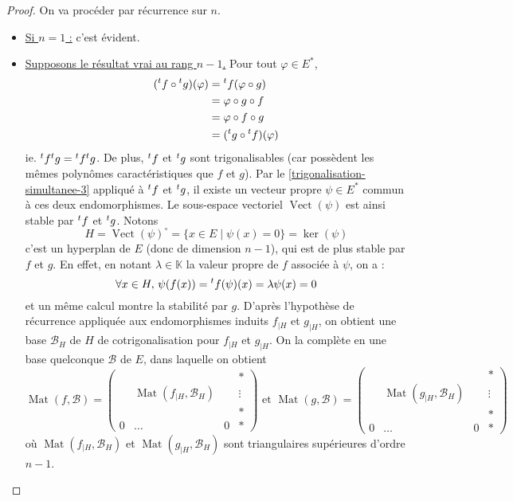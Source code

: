   \begin{proof}
    On va procéder par récurrence sur $n$.
    \begin{itemize}
      \item \uline{Si $n = 1$ :} c'est évident.
      \item \uline{Supposons le résultat vrai au rang $n - 1$.} Pour tout $\varphi \in E^*$,
      \begin{align*}
        (\mathstrut ^t f \circ \mathstrut ^t g)(\varphi) &= \mathstrut ^t f (\varphi \circ g) \\
        &= \varphi \circ g \circ f \\
        &= \varphi \circ f \circ g \\
        &= (\mathstrut ^t g \circ \mathstrut ^t f)(\varphi)
      \end{align*}
      ie. $\mathstrut ^t f \mathstrut ^t g = \mathstrut ^t f \mathstrut ^t g$. De plus, $\mathstrut ^t f$ et $\mathstrut ^t g$ sont trigonalisables (car possèdent les mêmes polynômes caractéristiques que $f$ et $g$). Par le \cref{trigonalisation-simultanee-3} appliqué à $\mathstrut ^t f$ et $\mathstrut ^t g$, il existe un vecteur propre $\psi \in E^*$ commun à ces deux endomorphismes. Le sous-espace vectoriel $\operatorname{Vect}(\psi)$ est ainsi stable par $\mathstrut ^t f$ et $\mathstrut ^t g$. Notons
      \[ H = \operatorname{Vect}(\psi)^{\circ} = \{ x \in E \mid \psi (x) = 0 \} = \ker(\psi) \]
      c'est un hyperplan de $E$ (donc de dimension $n-1$), qui est de plus stable par $f$ et $g$. En effet, en notant $\lambda \in \mathbb{K}$ la valeur propre de $f$ associée à $\psi$, on a :
      \[ \forall x \in H, \, \psi(f(x)) = \mathstrut ^t f(\psi)(x) = \lambda \psi(x) = 0 \]
      et un même calcul montre la stabilité par $g$. D'après l'hypothèse de récurrence appliquée aux endomorphismes induits $f_{|H}$ et $g_{|H}$, on obtient une base $\mathcal{B}_H$ de $H$ de cotrigonalisation pour $f_{|H}$ et $g_{|H}$. On la complète en une base quelconque $\mathcal{B}$ de $E$, dans laquelle on obtient
      \[
        \operatorname{Mat}(f, \mathcal{B}) =
        \begin{pmatrix}
          & & & * \\
          & \operatorname{Mat}(f_{|H}, \mathcal{B}_H) & & \vdots \\
          & & & * \\
          0 & \dots & 0 & *
        \end{pmatrix}
        \text{ et }
        \operatorname{Mat}(g, \mathcal{B}) =
        \begin{pmatrix}
          & & & * \\
          & \operatorname{Mat}(g_{|H}, \mathcal{B}_H) & & \vdots \\
          & & & * \\
          0 & \dots & 0 & *
        \end{pmatrix}
      \]
      où $\operatorname{Mat}(f_{|H}, \mathcal{B}_H)$ et $\operatorname{Mat}(g_{|H}, \mathcal{B}_H)$ sont triangulaires supérieures d'ordre $n-1$.
    \end{itemize}
  \end{proof}

